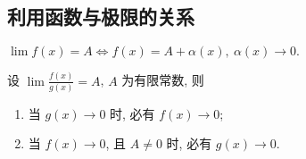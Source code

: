 \subsection{利用函数与极限的关系}

\begin{theorem}[极限值与函数式的转换]
    $\lim f(x)=A\Leftrightarrow f(x)=A+\alpha(x),~\alpha(x)\to0.$
\end{theorem}

\begin{theorem}[分式极限的关系]
    设 $\displaystyle\lim\frac{f(x)}{g(x)}=A$, $A$ 为有限常数, 则
    \label{f(x)g(x)A}
    \begin{enumerate}[label=(\arabic{*})]
        \item 当 $g(x)\to0$ 时, 必有 $f(x)\to0$;
        \item 当 $f(x)\to0$, 且 $A\not=0$ 时, 必有 $g(x)\to0$.
    \end{enumerate}
\end{theorem}

